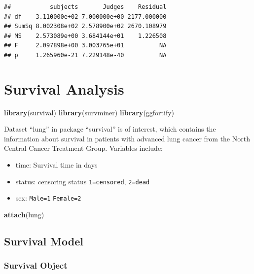 \documentclass[
]{ctexart}
\newenvironment{Shaded}{\begin{snugshade}}{\end{snugshade}}
\newcommand{\FunctionTok}[1]{\textcolor[rgb]{0.13,0.29,0.53}{\textbf{#1}}}
\newcommand{\NormalTok}[1]{#1}
\providecommand{\tightlist}{%
  \setlength{\itemsep}{0pt}\setlength{\parskip}{0pt}}
\begin{document}
\begin{verbatim}
##           subjects       Judges    Residual
## df    3.110000e+02 7.000000e+00 2177.000000
## SumSq 8.002308e+02 2.578900e+02 2670.108979
## MS    2.573089e+00 3.684144e+01    1.226508
## F     2.097898e+00 3.003765e+01          NA
## p     1.265960e-21 7.229148e-40          NA
\end{verbatim}

\hypertarget{survival-analysis}{%
\section{Survival Analysis}\label{survival-analysis}}

\begin{Shaded}
\begin{Highlighting}[]
\FunctionTok{library}\NormalTok{(survival)}
\FunctionTok{library}\NormalTok{(survminer)}
\FunctionTok{library}\NormalTok{(ggfortify)}
\end{Highlighting}
\end{Shaded}

Dataset ``lung'' in package ``survival'' is of interest, which contains
the information about survival in patients with advanced lung cancer
from the North Central Cancer Treatment Group. Variables include:

\begin{itemize}
\tightlist
\item
  time: Survival time in days
\item
  status: censoring status \texttt{1=censored}, \texttt{2=dead}
\item
  sex: \texttt{Male=1} \texttt{Female=2}
\end{itemize}

\begin{Shaded}
\begin{Highlighting}[]
\FunctionTok{attach}\NormalTok{(lung)}
\end{Highlighting}
\end{Shaded}

\hypertarget{survival-model}{%
\subsection{Survival Model}\label{survival-model}}

\hypertarget{survival-object}{%
\subsubsection{Survival Object}\label{survival-object}}
\end{document}
